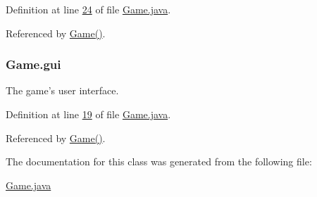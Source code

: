 Definition at line \hyperlink{Game_8java_source_l00024}{24} of file \hyperlink{Game_8java_source}{Game.\-java}.



Referenced by \hyperlink{Game_8java_source_l00029}{Game()}.

\hypertarget{classGame_a9003da90b15756c7975d03db874632a4}{
\subsubsection[{gui}]{ Game.\-gui\hspace{0.3cm}{\ttfamily [private]}}}\label{classGame_a9003da90b15756c7975d03db874632a4}


The game's user interface. 



Definition at line \hyperlink{Game_8java_source_l00019}{19} of file \hyperlink{Game_8java_source}{Game.\-java}.



Referenced by \hyperlink{Game_8java_source_l00029}{Game()}.



The documentation for this class was generated from the following file\-:\begin{DoxyCompactItemize}
\item 
\hyperlink{Game_8java}{Game.\-java}\end{DoxyCompactItemize}
